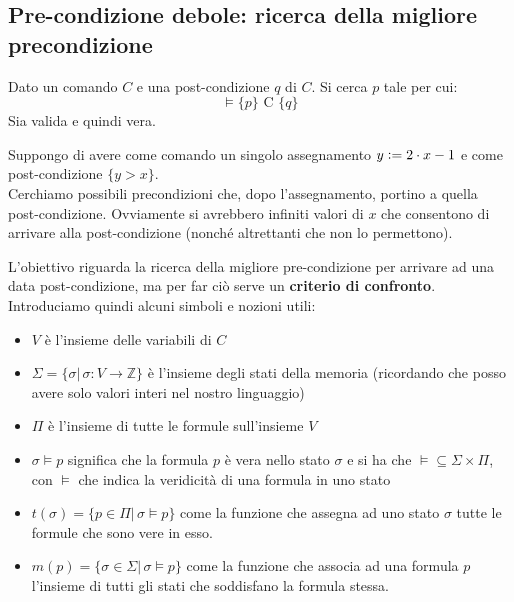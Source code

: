 				      				\subsection{Pre-condizione debole: ricerca della migliore precondizione}
				      				Dato un comando $C$ e una post-condizione $q$ di
				      				$C$. Si cerca $p$ tale per cui:
				      				\[\vDash\{p\}\mbox{ C } \{q\}\]
				      				Sia valida e quindi vera.\\
				      				\begin{esempio}
				      					Suppongo di avere come comando un singolo assegnamento $y\cceq 2\cdot x-1$ e
				      					come post-condizione $\{y>x\}$.\\
				      					Cerchiamo possibili precondizioni che, dopo l'assegnamento, portino a quella
				      					post-condizione. Ovviamente si avrebbero infiniti valori di $x$ che consentono
				      					di arrivare alla post-condizione (nonché altrettanti che non lo permettono). 
				      				\end{esempio}
				      				L'obiettivo riguarda la ricerca della migliore pre-condizione per arrivare ad una data
				      				post-condizione, ma per far ciò serve un \textbf{criterio di confronto}. Introduciamo quindi alcuni simboli e nozioni utili:
				      				\begin{itemize}
				      					\item $V$ è l'insieme delle variabili di $C$
				      					\item $\Sigma=\{\sigma|\,\sigma:V\to\mathbb{Z}\}$ è l'insieme degli stati
				      					      della memoria (ricordando che posso avere solo valori interi nel nostro
				      					      linguaggio)
				      					\item $\Pi$ è l'insieme di tutte le formule sull'insieme $V$
				      					\item $\sigma \vDash p$ significa che la formula $p$ è vera nello stato
				      					      $\sigma$ e si ha che $\vDash\subseteq\Sigma\times \Pi$, con $\vDash$ che
				      					      indica la veridicità di una formula in uno stato
				      					\item $t(\sigma)=\{p\in \Pi|\,\sigma\vDash p\}$ come la funzione che assegna
				      					      ad uno stato $\sigma$ tutte le formule che sono
				      					      vere in esso.
				      					\item $m(p)=\{\sigma\in \Sigma|\,\sigma\vDash p\}$ come la funzione che
				      					      associa ad una formula $p$ l'insieme di tutti gli stati che soddisfano la formula stessa.
				      				\end{itemize}
